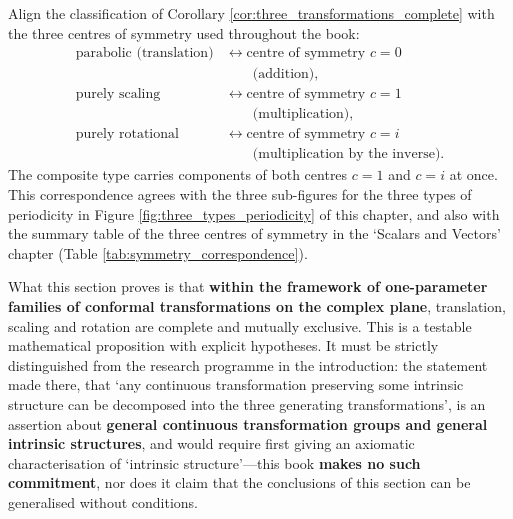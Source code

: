 \begin{remark}\label{rem:completeness_three_centres}
Align the classification of Corollary \ref{cor:three_transformations_complete} with the three centres of symmetry used throughout the book:
\[
\begin{aligned}
\text{parabolic (translation)}
    &\longleftrightarrow\text{centre of symmetry } c=0\\
    &\hspace{2em}\text{(addition)},\\[2pt]
\text{purely scaling}
    &\longleftrightarrow\text{centre of symmetry } c=1\\
    &\hspace{2em}\text{(multiplication)},\\[2pt]
\text{purely rotational}
    &\longleftrightarrow\text{centre of symmetry } c=i\\
    &\hspace{2em}\text{(multiplication by the inverse)}.
\end{aligned}
\]
The composite type carries components of both centres $c=1$ and $c=i$ at once. This correspondence agrees with the three sub-figures for the three types of periodicity in Figure \ref{fig:three_types_periodicity} of this chapter, and also with the summary table of the three centres of symmetry in the `Scalars and Vectors' chapter (Table \ref{tab:symmetry_correspondence}).
\end{remark}

\begin{remark}\label{rem:completeness_boundary}
What this section proves is that \textbf{within the framework of one-parameter families of conformal transformations on the complex plane}, translation, scaling and rotation are complete and mutually exclusive. This is a testable mathematical proposition with explicit hypotheses. It must be strictly distinguished from the research programme in the introduction: the statement made there, that `any continuous transformation preserving some intrinsic structure can be decomposed into the three generating transformations', is an assertion about \textbf{general continuous transformation groups and general intrinsic structures}, and would require first giving an axiomatic characterisation of `intrinsic structure'---this book \textbf{makes no such commitment}, nor does it claim that the conclusions of this section can be generalised without conditions.
\end{remark}

